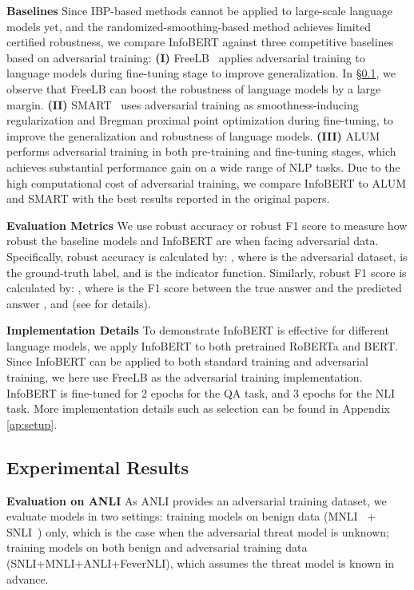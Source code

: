 \documentclass{article} \usepackage{iclr2021_conference,times}
\theoremstyle{definition}
\theoremstyle{remark}
\newcommand{\method}{InfoBERT\xspace}
\newcommand{\modified}[1]{{\color{black}{#1}}}
\begin{document}
\textbf{Baselines} Since IBP-based methods \citep{ibp1,ibp2} cannot be applied to large-scale language models yet, and the randomized-smoothing-based method \citep{safer} achieves limited certified robustness, we compare \method against three competitive baselines based on adversarial training: \textbf{(I)} FreeLB~\citep{freelb} applies adversarial training to language models during fine-tuning stage to improve generalization. In \S\ref{sec:results}, we observe that FreeLB can boost the robustness of language models by a large margin. 
\textbf{(II)} SMART~\citep{smart} uses adversarial training as smoothness-inducing regularization and Bregman proximal point optimization during fine-tuning, to improve the generalization and robustness of language models. 
\textbf{(III)} ALUM~\citep{alum} performs adversarial training in both pre-training and fine-tuning stages, which achieves substantial performance gain on a wide range of NLP tasks. Due to the high computational cost of adversarial training, we compare \method to ALUM and SMART with the best results reported in the original papers.

\textbf{Evaluation Metrics} 
We use robust accuracy or robust F1 score to measure how robust the baseline models and \method are when facing adversarial data. Specifically, robust accuracy is calculated by: , where   is the adversarial dataset,  is the ground-truth label, \modified{ selects the class with the highest logits} and  is the indicator function. Similarly, robust F1 score is calculated by: , where  is the F1 score between the true answer  and the predicted answer , and \modified{ selects the answer with the highest probability}  (see \citet{squad} for details).

\textbf{Implementation Details}  To demonstrate \method is effective for different language models, we apply \method to both pretrained RoBERTa and BERT. Since \method can be applied to both standard training and adversarial training, we here use FreeLB as the adversarial training implementation. \method is fine-tuned for 2 epochs for the QA task, and 3 epochs for the NLI task. More implementation details such as  selection can be found in Appendix \ref{ap:setup}.

\subsection{Experimental Results} \label{sec:results} 
\textbf{Evaluation on ANLI} As ANLI provides an adversarial training dataset, we evaluate models in two settings:  training models on benign data (MNLI~\citep{mnli} + SNLI~\citep{snli}) only, which is the case when the adversarial threat model is unknown;  training models on both benign and adversarial training data (SNLI+MNLI+ANLI+FeverNLI), which assumes the threat model is known in advance. 
\end{document}
